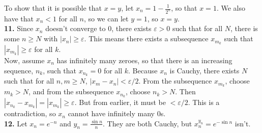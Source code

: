 \documentclass{article}
\newcommand{\eps}{\varepsilon}
\begin{document}
To show that it is possible that $x = y$, let $x_n = 1 - \frac{1}{2^n}$, so that $x = 1$. We also have that $x_n < 1$ for all $n$, so we can let $y = 1$, so $x = y$. \\

\textbf{11.} Since $x_n$ doesn't converge to $0$, there exists $\eps > 0$ such that for all $N$, there is some $n \ge N$ with $|x_n| \ge \eps$. This means there exists a subsequence $x_{m_k}$ such that $|x_{m_k}| \ge \eps$ for all $k$. \\

Now, assume $x_n$ has infinitely many zeroes, so that there is an increasing sequence, $n_k$, such that $x_{n_k} = 0$ for all $k$. Because $x_n$ is Cauchy, there exists $N$ such that for all $n, m \ge N$, $|x_m - x_n| < \eps/2$. From the subsequence $x_{m_k}$, choose $m_k > N$, and from the subsequence $x_{n_k}$, choose $n_k > N$. Then $|x_{n_k} - x_{m_k}| = |x_{m_k}| \ge \eps$. But from earlier, it must be $< \eps/2$. This is a contradiction, so $x_n$ cannot have infinitely many $0$s. \\

\textbf{12.} Let $x_n = e^{-n}$ and $y_n = \frac{\sin n}{n}$. They are both Cauchy, but $x_n^{y_n} = e^{-\sin n}$ isn't.
\end{document}
